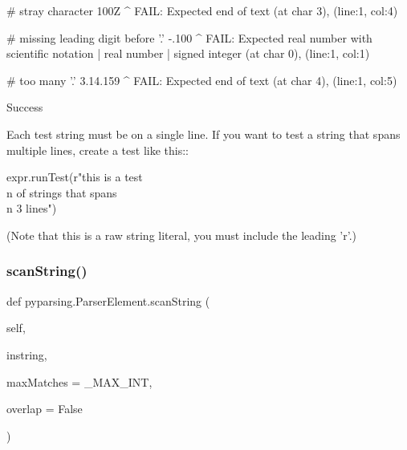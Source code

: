 \begin{DoxyVerb}
    # stray character
    100Z
       ^
    FAIL: Expected end of text (at char 3), (line:1, col:4)

    # missing leading digit before '.'
    -.100
    ^
    FAIL: Expected {real number with scientific notation | real number | signed integer} (at char 0), (line:1, col:1)

    # too many '.'
    3.14.159
^
    FAIL: Expected end of text (at char 4), (line:1, col:5)

    Success

Each test string must be on a single line. If you want to test a string that spans multiple
lines, create a test like this::

    expr.runTest(r"this is a test\\n of strings that spans \\n 3 lines")

(Note that this is a raw string literal, you must include the leading 'r'.)
\end{DoxyVerb}
 \mbox{\label{classpyparsing_1_1ParserElement_ae2359510cb75269e8f67637112ca4783}} 
\subsubsection{\texorpdfstring{scan\+String()}{scanString()}}
{\footnotesize\ttfamily def pyparsing.\+Parser\+Element.\+scan\+String (\begin{DoxyParamCaption}\item[{}]{self,  }\item[{}]{instring,  }\item[{}]{max\+Matches = {\ttfamily \+\_\+MAX\+\_\+INT},  }\item[{}]{overlap = {\ttfamily False} }\end{DoxyParamCaption})}

